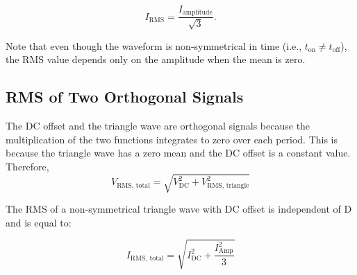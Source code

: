 \documentclass{article}
\begin{document}
\[
\boxed{ I_{\text{RMS}} = \frac{I_{\text{amplitude}}}{\sqrt{3}}. }
\]

Note that even though the waveform is non-symmetrical in time (i.e., \(t_{\text{on}} \neq t_{\text{off}}\)), the RMS value depends only on the amplitude when the mean is zero.

\subsection{RMS of Two Orthogonal Signals}

The DC offset and the triangle wave are orthogonal signals because the multiplication of the two functions integrates to zero over each period. This is because the triangle wave has a zero mean and the DC offset is a constant value. \\

Therefore,
\[
V_{\text{RMS, total}} = \sqrt{V_{\text{DC}}^2 + V_{\text{RMS, triangle}}^2}
\]

The RMS of a non-symmetrical triangle wave with DC offset is independent of D and is equal to:

\[
\boxed{I_{\text{RMS, total}} = \sqrt{I_{\text{DC}}^2 + \frac{I_\text{Amp}^2}{3}}}
\]

\printbibliography
\end{document}

